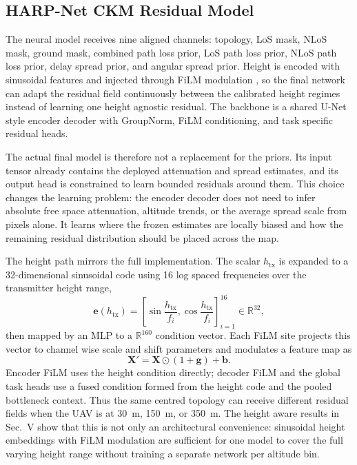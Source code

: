\documentclass[journal]{IEEEtran}
\begin{document}
\subsection{HARP-Net CKM Residual Model}

The neural model receives nine aligned channels: topology, LoS mask, NLoS
mask, ground mask, combined path loss prior, LoS path loss prior, NLoS
path loss prior, delay spread prior, and angular spread prior. Height is
encoded with sinusoidal features and injected through FiLM modulation
\cite{perez2018film}, so the final network can adapt the residual field
continuously between the calibrated height regimes instead of learning one
height agnostic residual. The backbone is a shared U-Net style
encoder decoder with GroupNorm, FiLM conditioning, and task specific residual
heads.

The actual final model is therefore not a replacement for the priors. Its
input tensor already contains the deployed attenuation and spread estimates, and
its output head is constrained to learn bounded residuals around them. This
choice changes the learning problem: the encoder decoder does not need to infer
absolute free space attenuation, altitude trends, or the average spread scale
from pixels alone. It learns where the frozen estimates are locally biased and
how the remaining residual distribution should be placed across the map.

The height path mirrors the full implementation. The scalar
\(h_{\mathrm{tx}}\) is expanded to a 32-dimensional sinusoidal code using
16 log spaced frequencies over the transmitter height range,
\begin{equation}
\mathbf{e}(h_{\mathrm{tx}})
=
\left[
\sin\!\frac{h_{\mathrm{tx}}}{f_i},
\cos\!\frac{h_{\mathrm{tx}}}{f_i}
\right]_{i=1}^{16}
\in\mathbb{R}^{32},
\label{eq:height-embed-paper}
\end{equation}
then mapped by an MLP to a \(\mathbb{R}^{160}\) condition vector. Each FiLM
site projects this vector to channel wise scale and shift parameters and
modulates a feature map as
\begin{equation}
\mathbf{X}'=\mathbf{X}\odot(1+\mathbf{g})+\mathbf{b}.
\label{eq:film-paper}
\end{equation}
Encoder FiLM uses the height condition directly; decoder FiLM and the global
task heads use a fused condition formed from the height code and the pooled
bottleneck context. Thus the same centred topology can receive different
residual fields when the UAV is at \SI{30}{m}, \SI{150}{m}, or
\SI{350}{m}. The height aware results in Sec.~V show that this is not only an
architectural convenience: sinusoidal height embeddings with FiLM modulation are
sufficient for one model to cover the full varying height range without
training a separate network per altitude bin.
\end{document}
